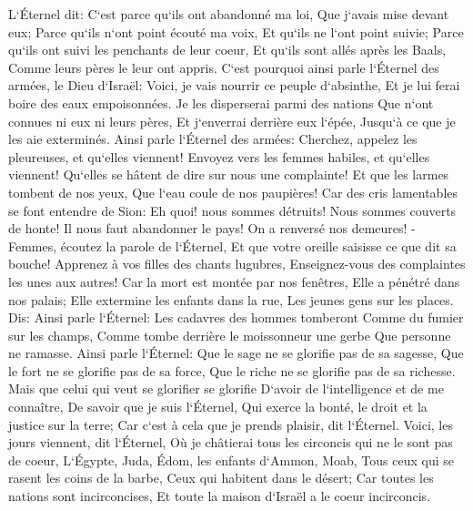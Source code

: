 \verse L`Éternel dit: C`est parce qu`ils ont abandonné ma loi, Que j`avais mise devant eux; Parce qu`ils n`ont point écouté ma voix, Et qu`ils ne l`ont point suivie; 
\verse Parce qu`ils ont suivi les penchants de leur coeur, Et qu`ils sont allés après les Baals, Comme leurs pères le leur ont appris. 
\verse C`est pourquoi ainsi parle l`Éternel des armées, le Dieu d`Israël: Voici, je vais nourrir ce peuple d`absinthe, Et je lui ferai boire des eaux empoisonnées. 
\verse Je les disperserai parmi des nations Que n`ont connues ni eux ni leurs pères, Et j`enverrai derrière eux l`épée, Jusqu`à ce que je les aie exterminés. 
\verse Ainsi parle l`Éternel des armées: Cherchez, appelez les pleureuses, et qu`elles viennent! Envoyez vers les femmes habiles, et qu`elles viennent! 
\verse Qu`elles se hâtent de dire sur nous une complainte! Et que les larmes tombent de nos yeux, Que l`eau coule de nos paupières! 
\verse Car des cris lamentables se font entendre de Sion: Eh quoi! nous sommes détruits! Nous sommes couverts de honte! Il nous faut abandonner le pays! On a renversé nos demeures! - 
\verse Femmes, écoutez la parole de l`Éternel, Et que votre oreille saisisse ce que dit sa bouche! Apprenez à vos filles des chants lugubres, Enseignez-vous des complaintes les unes aux autres! 
\verse Car la mort est montée par nos fenêtres, Elle a pénétré dans nos palais; Elle extermine les enfants dans la rue, Les jeunes gens sur les places. 
\verse Dis: Ainsi parle l`Éternel: Les cadavres des hommes tomberont Comme du fumier sur les champs, Comme tombe derrière le moissonneur une gerbe Que personne ne ramasse. 
\verse Ainsi parle l`Éternel: Que le sage ne se glorifie pas de sa sagesse, Que le fort ne se glorifie pas de sa force, Que le riche ne se glorifie pas de sa richesse. 
\verse Mais que celui qui veut se glorifier se glorifie D`avoir de l`intelligence et de me connaître, De savoir que je suis l`Éternel, Qui exerce la bonté, le droit et la justice sur la terre; Car c`est à cela que je prends plaisir, dit l`Éternel. 
\verse Voici, les jours viennent, dit l`Éternel, Où je châtierai tous les circoncis qui ne le sont pas de coeur, 
\verse L`Égypte, Juda, Édom, les enfants d`Ammon, Moab, Tous ceux qui se rasent les coins de la barbe, Ceux qui habitent dans le désert; Car toutes les nations sont incirconcises, Et toute la maison d`Israël a le coeur incirconcis. 

